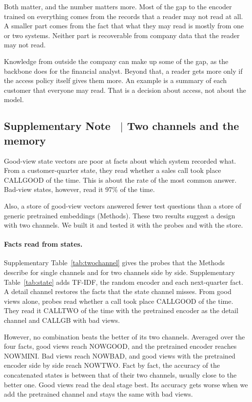 \documentclass[11pt]{article}
\newcounter{suppnote}
\newcommand{\suppnote}[2]{\refstepcounter{suppnote}\label{#2}\subsection{Supplementary Note \thesuppnote\ $|$ #1}}
\begin{document}
Both matter, and the number matters more. Most of the gap to the encoder trained on everything comes from the records that a reader may not read at all. A smaller part comes from the fact that what they may read is mostly from one or two systems. Neither part is recoverable from company data that the reader may not read.

Knowledge from outside the company can make up some of the gap, as the backbone does for the financial analyst. Beyond that, a reader gets more only if the access policy itself gives them more. An example is a summary of each customer that everyone may read. That is a decision about access, not about the model.

\suppnote{Two channels and the memory}{sec:twochannel}
Good-view state vectors are poor at facts about which system recorded what. From a customer-quarter state, they read whether a sales call took place CALLGOOD of the time. This is about the rate of the most common answer. Bad-view states, however, read it 97\% of the time.

Also, a store of good-view vectors answered fewer test questions than a store of generic pretrained embeddings (Methods). These two results suggest a design with two channels. We built it and tested it with the probes and with the store.

\paragraph{Facts read from states.} Supplementary Table~\ref{tab:twochannel} gives the probes that the Methods describe for single channels and for two channels side by side. Supplementary Table~\ref{tab:state} adds TF-IDF, the random encoder and each next-quarter fact. A detail channel restores the facts that the state channel misses. From good views alone, probes read whether a call took place CALLGOOD of the time. They read it CALLTWO of the time with the pretrained encoder as the detail channel and CALLGB with bad views.

However, no combination beats the better of its two channels. Averaged over the four facts, good views reach NOWGOOD, and the pretrained encoder reaches NOWMINI. Bad views reach NOWBAD, and good views with the pretrained encoder side by side reach NOWTWO. Fact by fact, the accuracy of the concatenated states is between that of their two channels, usually close to the better one. Good views read the deal stage best. Its accuracy gets worse when we add the pretrained channel and stays the same with bad views.
\end{document}
